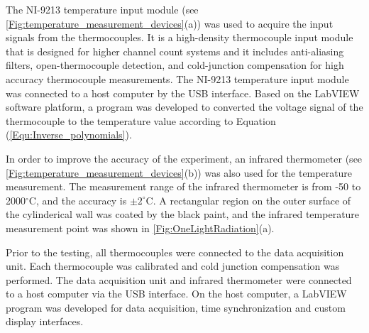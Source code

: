 
The NI-9213 temperature input module (see \ref{Fig:temperature_measurement_devices}(a)) was used to acquire the input signals from the thermocouples. It is a high-density thermocouple input module that is designed for higher channel count systems and it includes anti-aliasing filters, open-thermocouple detection, and cold-junction compensation for high accuracy thermocouple measurements. 
The NI-9213 temperature input module was connected to a host computer by the USB interface. Based on the LabVIEW software platform, a program was developed to converted the voltage signal of the thermocouple to the temperature value according to Equation (\ref{Equ:Inverse_polynomials}).

In order to improve the accuracy of the experiment, an infrared thermometer (see \ref{Fig:temperature_measurement_devices}(b)) was also used for the temperature measurement.
The measurement range of the infrared thermometer is from -50 to 2000$^{\circ}$C, and the accuracy is $\pm2^{\circ}$C.
A rectangular region on the outer surface of the cylinderical wall was coated by the black paint, and the infrared temperature measurement point was shown in \ref{Fig:OneLightRadiation}(a).

Prior to the testing, all thermocouples were connected to the data acquisition unit. Each thermocouple was calibrated and cold junction compensation was performed.
The data acquisition unit and infrared thermometer were connected to a host computer via the USB interface.
On the host computer, a LabVIEW program was developed for data acquisition, time synchronization and custom display interfaces.

